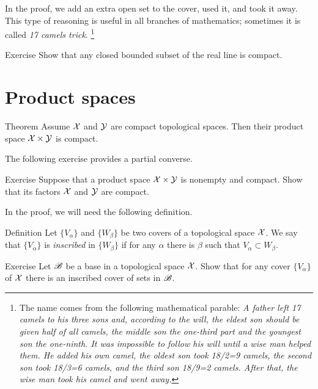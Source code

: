 In the proof, we add an extra open set to the cover, used it, and took it away.
This type of reasoning is useful in all branches of mathematics;
sometimes it is called \emph{17 camels trick}.%
\footnote{The name comes from the following mathematical parable:
\textit{A father left 17 camels to his three sons and, according to the will, the eldest son should be given  half of all camels, the middle son the one-third part and the youngest son the one-ninth.
It was impossible to follow his will until a wise man helped them.
He added his own camel, the oldest son took 18/2=9 camels, the second son took 18/3=6 camels, and the third son 18/9=2 camels.
After that, the wise man took his camel and went away.}}


\begin{thm}{Exercise}
Show that any closed bounded subset of the real line is compact.
\end{thm}

 
\section{Product spaces}

\begin{thm}{Theorem}\label{thm:compact-product}
Assume $\mathcal{X}$ and $\mathcal{Y}$ are compact topological spaces.
Then their product space $\mathcal{X}\times\mathcal{Y}$ is compact.
\end{thm}

The following exercise provides a partial converse.

\begin{thm}{Exercise}
Suppose that a product space $\mathcal{X}\times\mathcal{Y}$ is nonempty and compact.
Show that its factors $\mathcal{X}$ and $\mathcal{Y}$ are compact.
\end{thm} 

In the proof, we will need the following definition.

\begin{thm}{Definition}
Let $\{V_\alpha\}$ and $\{W_\beta\}$ be two covers of a topological space $\mathcal{X}$.
We say that $\{V_\alpha\}$ is \emph{inscribed} in $\{W_\beta\}$ if for any $\alpha$ there is $\beta$ such that $V_\alpha\subset W_\beta$.
\end{thm}

\begin{thm}{Exercise}
Let $\mathscr{B}$ be a base in a topological space $\mathcal{X}$.
Show that for any cover $\{V_\alpha\}$ of $\mathcal{X}$ there is an inscribed cover of sets in $\mathscr{B}$.
\end{thm}

